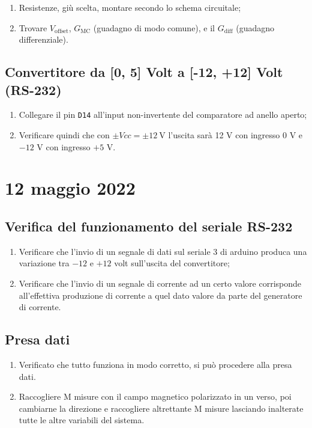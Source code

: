 \documentclass[fleqn,varvw,preprintnumbers,citeautoscript]{memo}
\begin{document}
\begin{enumerate}
    \item Resistenze, giù scelta, montare secondo lo schema circuitale;
    \item Trovare $V_\text{offset}$, $G_\text{MC}$ (guadagno di modo comune), e il $G_\text{diff}$ (guadagno differenziale). 
\end{enumerate}

\subsection{Convertitore da [0, 5] Volt a [-12, +12] Volt (RS-232)}

\begin{enumerate}
    \item Collegare il pin \verb-D14- all'input non-invertente del comparatore ad anello aperto;
    \item Verificare quindi che con $\pm Vcc = \pm\SI{12}{\volt}$ l'uscita sarà 12 V con ingresso 0 V e $-12$ V con ingresso $+5$ V.
\end{enumerate}

\section{12 maggio 2022}

\subsection{Verifica del funzionamento del seriale RS-232} 
\begin{enumerate}
    \item Verificare che l'invio di un segnale di dati sul seriale 3 di arduino produca una variazione tra $-12$ e $+12$ volt sull'uscita del convertitore;
    \item Verificare che l'invio di un segnale di corrente ad un certo valore corrisponde all'effettiva produzione di corrente a quel dato valore da parte del generatore di corrente.
\end{enumerate}

\subsection{Presa dati}
\begin{enumerate}
    \item Verificato che tutto funziona in modo corretto, si può procedere alla presa dati.
    \item Raccogliere M misure con il campo magnetico polarizzato in un verso, poi cambiarne la direzione e raccogliere altrettante M misure lasciando inalterate tutte le altre variabili del sistema.
\end{enumerate}
\end{document}
